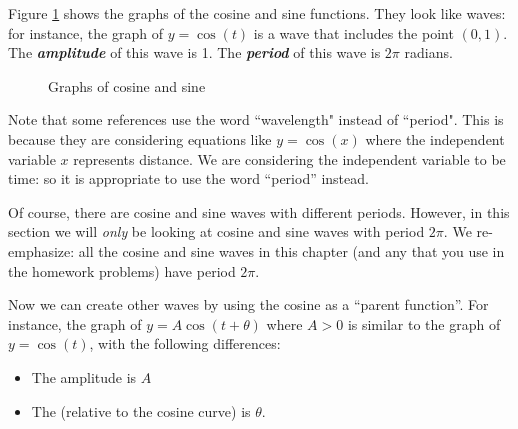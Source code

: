 Figure \ref{fig:complex:1} shows the graphs of the cosine and sine functions.  They look like waves: for instance, the graph of $y = \cos(t)$ is a wave that includes the point $(0,1)$. The {\bf \emph{amplitude}} of this wave is 1. The {\bf \emph{period}} of this wave is $2\pi$ radians. 

\begin{figure}[htb]
	  \caption{\label{fig:complex:1} Graphs of cosine and sine }
\end{figure}


Note that some references use the word ``wavelength" instead of ``period". This is because they are considering equations like $y = \cos(x)$ where the independent variable $x$ represents distance. We are considering the independent variable to be time: so it is appropriate to use the word ``period'' instead.

Of course, there are cosine and sine waves with different periods. However, in this section  we will \emph{only}  be looking at cosine and sine waves with period $2\pi$. We re-emphasize:  all the cosine and sine waves in this chapter (and any that you use in the homework problems) have period $2 \pi$.

Now we can create other waves by using the cosine as a ``parent function''. For instance, the graph of
$y = A  \cos ( t + \theta) $ where $A > 0$
is similar to the graph of $y = \cos(t)$, with the following differences:

\begin{itemize}
\item
The amplitude is $A$
\item
The  (relative to the cosine curve) is $\theta$. 
\end{itemize}

